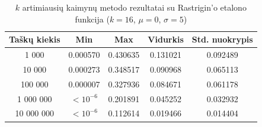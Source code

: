 \begin{table}[H]
    \centering
    \begin{tabular}{|c|c|c|c|c|}
        \hline
        \textbf{Taškų kiekis} & \textbf{Min} & \textbf{Max} & \textbf{Vidurkis} & \textbf{Std. nuokrypis} \\ \hline
        1 000        & 0.000570 & 0.430635 & 0.131021 & 0.092489 \\ \hline
        10 000       & 0.000273 & 0.348517 & 0.090968 & 0.065113 \\ \hline
        100 000      & 0.000007 & 0.327936 & 0.084671 & 0.061178 \\ \hline
        1 000 000    & $<10^{-6}$ & 0.201891 & 0.045252 & 0.032932 \\ \hline
        10 000 000   & $<10^{-6}$ & 0.112614 & 0.019466 & 0.014404 \\ \hline
    \end{tabular}
    \caption{$k$ artimiausių kaimynų metodo rezultatai su Rastrigin'o etalono funkcija ($k = 16$, $\mu = 0$, $\sigma = 5$)}
\end{table}